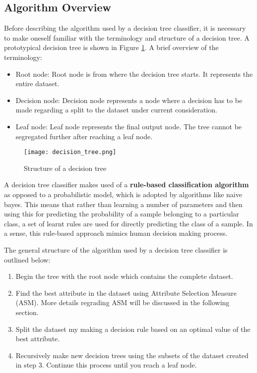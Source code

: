 \documentclass[conference]{IEEEtran}
\begin{document}
\subsection{Algorithm Overview}

Before describing the algorithm used by a decision tree classifier, it is necessary to make oneself familiar with the terminology and structure of a decision tree. A prototypical decision tree is shown in Figure \ref{decision_tree}. A brief overview of the terminology:
\begin{itemize}
    \item Root node: Root node is from where the decision tree starts. It represents the entire dataset.
    \item Decision node: Decision node represents a node where a decision has to be made regarding a split to the dataset under current consideration.
    \item Leaf node: Leaf node represents the final output node. The tree cannot be segregated further after reaching a leaf node.
\end{itemize}

\begin{figure}[tbh]
\centering
\texttt{[image: decision\_tree.png]}
\caption{Structure of a decision tree}
\label{decision_tree}
\end{figure}

A decision tree classifier makes used of a \textbf{rule-based classification algorithm} as opposed to a probabilistic model, which is adopted by algorithms like naive bayes. This means that rather than learning a number of parameters and then using this for predicting the probability of a sample belonging to a particular class, a set of learnt rules are used for directly predicting the class of a sample. In a sense, this rule-based approach mimics human decision making process.

The general structure of the algorithm used by a decision tree classifier is outlined below:

\begin{enumerate}
    \item Begin the tree with the root node which contains the complete dataset. 
    \item Find the best attribute in the dataset using Attribute Selection Measure (ASM). More details regrading ASM will be discussed in the following section.
    \item Split the dataset my making a decision rule based on an optimal value of the best attribute.
    \item Recursively make new decision trees using the subsets of the dataset created in step 3. Continue this process until you reach a leaf node. 
\end{enumerate}
\end{document}
